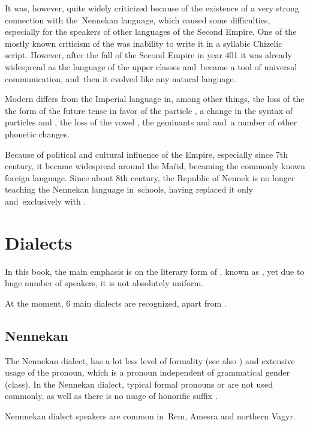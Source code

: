 It was, however, quite widely criticized because of the existence of a very
strong connection with the~Nennekan language, which caused some difficulties,
especially for the speakers of other languages of the Second Empire. One of the
mostly known criticism of the  was inability to write it in
a syllabic Chizelic script. However, after the fall of the Second Empire in year
401 it was already widespread as the language of the upper classes and~became a
tool of universal communication, and~then it evolved like any natural language.

Modern \andro differs from the Imperial language in, among other things, the
loss of the the form of the future tense in favor of the particle , a
change in the syntax of particles  and , the loss of the
vowel , the geminants  and  and~a number of other phonetic
changes.

Because of political and cultural influence of the Empire, especially since 7th
century, it became widespread around the Maŕid, becaming the commonly known
foreign language. Since about 8th century, the Republic of Nennek is no longer
teaching the Nennekan language in~schools, having replaced it only
and~exclusively with \andro.

\section{Dialects}

In this book, the main emphasis is on the literary form of \andro, known
as , yet due to huge number of speakers, it is
not absolutely uniform.

At the moment, 6 main dialects are recognized, apart from .

\subsection{Nennekan}

The Nennekan dialect, has a lot less level of formality (see also
) and extensive usage of the  pronoun,
which is a \Tsg{} pronoun independent of grammatical gender (class). In the
Nennekan dialect, typical formal pronouns  or  are
not used commonly, as well as there is no usage of honorific suffix
.

Nennnekan dialect speakers are common in~Rem, Amesra and northern Vagyr.

